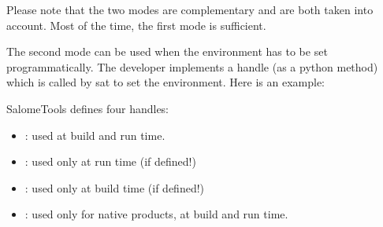 \documentclass[a4paper,10pt,english]{sphinxmanual}
\begin{document}
Please note that the two modes are complementary and are both taken into account.
Most of the time, the first mode is sufficient.

The second mode can be used when the environment has to be set programmatically.
The developer implements a handle (as a python method)
which is called by sat to set the environment.
Here is an example:

%
\begin{sphinxVerbatim}[commandchars=\\\{\}]

 
 

   
      
      
      
\end{sphinxVerbatim}

SalomeTools defines four handles:
\begin{itemize}
\item {} 
 : used at build and run time.

\item {} 
 : used only at run time (if defined!)

\item {} 
 : used only at build time (if defined!)

\item {} 
 : used only for native products, at build and run time.

\end{itemize}
\end{document}
